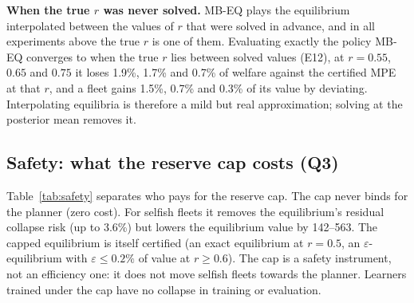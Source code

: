 \textbf{When the true $r$ was never solved.} MB-EQ plays the equilibrium interpolated between the values of $r$ that were
solved in advance, and in all experiments above the true $r$ is one of them. Evaluating exactly the policy MB-EQ converges
to when the true $r$ lies between solved values (E12), at $r=0.55$, $0.65$ and $0.75$ it loses 1.9\%, 1.7\% and 0.7\% of
welfare against the certified MPE at that $r$, and a fleet gains 1.5\%, 0.7\% and 0.3\% of its value by deviating.
Interpolating equilibria is therefore a mild but real approximation; solving at the posterior mean removes it.

\subsection{Safety: what the reserve cap costs (Q3)}
Table~\ref{tab:safety} separates who pays for the reserve cap. The cap never binds for the planner (zero cost). For
selfish fleets it removes the equilibrium's residual collapse risk (up to 3.6\%) but lowers the equilibrium value by
142--563. The capped equilibrium is itself certified (an exact equilibrium at $r=0.5$, an $\varepsilon$-equilibrium with
$\varepsilon\le0.2\%$ of value at $r\ge0.6$). The cap is a safety instrument, not an efficiency one: it does not move
selfish fleets towards the planner. Learners trained under the cap have no collapse in training or evaluation.

\begin{table}[H]
\centering
\caption{Reserve cap ($S_{\text{res}}=25$): planner and best certified MPE without and with the cap, and the MPE collapse rate.}
\label{tab:safety}
\small

\end{table}

